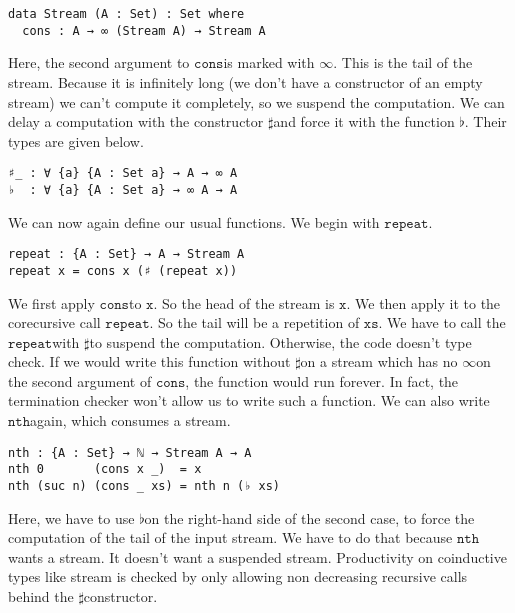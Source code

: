 \documentclass[a4paper,cleardoubleempty,BCOR1cm]{scrbook}
\begin{document}
\begin{verbatim}
data Stream (A : Set) : Set where
  cons : A → ∞ (Stream A) → Stream A
\end{verbatim}

Here, the second argument to $\mathtt{cons}$\;is marked with $\mathtt{\infty}$. This is the tail of
the stream. Because it is infinitely long (we don't have a constructor of an
empty stream) we can't compute it completely, so we suspend the computation.
We can delay a computation with the constructor $\mathtt{\sharp}$\;and force it with
the function $\mathtt{\flat}$. Their types are given below.

\begin{verbatim}
♯_ : ∀ {a} {A : Set a} → A → ∞ A
♭  : ∀ {a} {A : Set a} → ∞ A → A
\end{verbatim}

We can now again define our usual functions.  We begin with $\mathtt{repeat}$.

\begin{verbatim}
repeat : {A : Set} → A → Stream A
repeat x = cons x (♯ (repeat x))
\end{verbatim}

We first apply $\mathtt{cons}$\;to $\mathtt{x}$. So the head of the stream is $\mathtt{x}$. We then apply
it to the corecursive call $\mathtt{repeat}$. So the tail will be a repetition of
$\mathtt{xs}$. We have to call the $\mathtt{repeat}$\;with $\mathtt{\sharp}$\;to suspend the computation.
Otherwise, the code doesn't type check. If we would write this function
without $\mathtt{\sharp}$\;on a stream which has no $\mathtt{\infty}$\;on the second argument of
$\mathtt{cons}$, the function would run forever. In fact, the termination checker won't
allow us to write such a function. We can also write $\mathtt{nth}$\;again, which
consumes a stream.

\begin{verbatim}
nth : {A : Set} → ℕ → Stream A → A
nth 0       (cons x _)  = x
nth (suc n) (cons _ xs) = nth n (♭ xs)
\end{verbatim}

Here, we have to use $\mathtt{\flat}$\;on the right-hand side of the second case, to
force the computation of the tail of the input stream.  We have to do that
because $\mathtt{nth}$\;wants a stream.  It doesn't want a suspended stream.
Productivity on coinductive types like stream is checked by only allowing non
decreasing recursive calls behind the $\mathtt{\sharp}$\;constructor.
\end{document}
